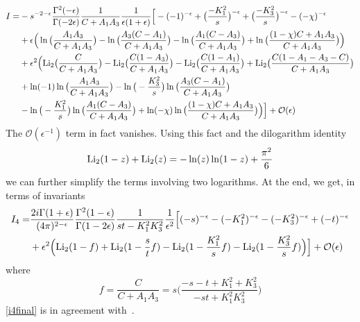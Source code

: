 \begin{equation*}
\begin{split}
I  = &
-s^{-2-\epsilon}\frac{\Gamma^2(-\epsilon)}{\Gamma(-2\epsilon)}
\frac{1}{C+A_1A_3}\frac{1}{\epsilon(1+\epsilon)}\Big[
-(-1)^{-\epsilon} + \big(\frac{-K_1^2}{s}\big)^{-\epsilon} + \big(\frac{-K_3^2}{s}\big)^{-\epsilon} - (-\chi)^{-\epsilon}
\\
&+
\epsilon\Big(\ln\big(\frac{A_1A_3}{C+A_1A_3}\big) - \ln\big(\frac{A_3(C-A_1 )}{C+A_1A_3}\big) - \ln\big(\frac{A_1(C-A_3)}{C+A_1A_3}\big) +
\ln\big(\frac{(1-\chi)C + A_1A_3}{C+A_1A_3}\big) 
\Big)
\\
& +\epsilon^2\Big(
\mathrm{Li}_2\big(\frac{C}{C+A_1A_3}\big) - \mathrm{Li}_2\big(\frac{C(1-A_3)}{C+A_1A_3}\big) - \mathrm{Li}_2\big(\frac{C(1-A_1)}{C+A_1A_3}\big)+\mathrm{Li}_2\big(\frac{C(1-A_1-A_3-C)}{C+A_1A_3}\big)
\\
& +\ln(-1)\ln\big(\frac{A_1A_3}{C+A_1A_3}\big)
-\ln\big(-\frac{K_3^2}{s}\big)\ln\big(\frac{A_3(C-A_1)}{C+A_1A_3}\big)
\\
&
-\ln\big(-\frac{K_1^2}{s}\big)\ln\big(\frac{A_1(C-A_3)}{C+A_1A_3}\big)
+\ln(-\chi)\ln\big(\frac{(1-\chi)C + A_1A_3}{C+A_1A_3}\big)
\Big)
\Big]
+\mathcal{O}(\epsilon)
\end{split}
\end{equation*}
The $\mathcal{O}(\epsilon^{-1})$ term in fact vanishes. 
Using this fact and the dilogarithm identity
\begin{equation*}
\mathrm{Li}_2(1-z) +\mathrm{Li}_2(z) = -\ln(z)\ln(1-z) + \frac{\pi^2}{6}
\end{equation*}
we can further simplify the terms involving two logarithms.
At the end, we get, in terms of invariants
\begin{equation}\label{i4final}
\begin{split}
I_4 = &\frac{2i\Gamma(1+\epsilon)}{(4\pi)^{2-\epsilon}}\frac{ \Gamma^2(1-\epsilon)}{\Gamma(1-2\epsilon)}\frac{1}{st-K_1^2K_3^2}\frac{1}{\epsilon^2}
\Big[
(-s)^{-\epsilon} - (-K_1^2)^{-\epsilon} - (-K_3^2)^{-\epsilon} + (-t)^{-\epsilon}
\\&
+\epsilon^2\Big(
\mathrm{Li}_2(1-f) + \mathrm{Li}_2(1-\frac{s}{t}f) - \mathrm{Li}_2(1-\frac{K_1^2}{s}f) - \mathrm{Li}_2(1-\frac{K_3^2}{s}f)
\Big)
\Big]
+\mathcal{O}(\epsilon)
\end{split}
\end{equation}
where
\begin{equation*}
f=\frac{C}{C+A_1A_3} = s\Big( \frac{-s-t + K_1^2 + K_3^2}{-st + K_1^2K_3^2}\Big)
\end{equation*}
\cref{i4final} is in agreement with~\cite{Duplancic:2000sk}. 
